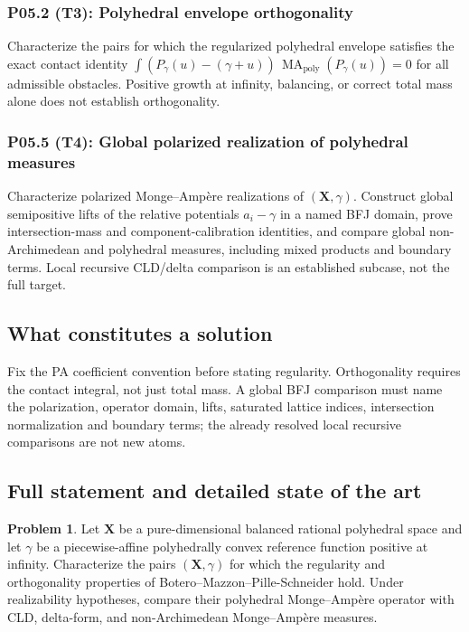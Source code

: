 \documentclass[11pt,a4paper]{article}
\theoremstyle{definition}
\newtheorem{problem}{Problem}[section]
\theoremstyle{remark}
\DeclareMathOperator{\MA}{MA}
\begin{document}
\subsubsection*{P05.2 (T3): Polyhedral envelope orthogonality}
\label{atom:P05.2}
Characterize the pairs for which the regularized polyhedral envelope satisfies the exact contact identity \(\int(P_\gamma(u)-(\gamma+u))\,\MA_{\mathrm{poly}}(P_\gamma(u))=0\) for all admissible obstacles. Positive growth at infinity, balancing, or correct total mass alone does not establish orthogonality.

\subsubsection*{P05.5 (T4): Global polarized realization of polyhedral measures}
\label{atom:P05.5}
Characterize polarized Monge--Ampère realizations of \((\mathbf X,\gamma)\). Construct global semipositive lifts of the relative potentials \(a_i-\gamma\) in a named BFJ domain, prove intersection-mass and component-calibration identities, and compare global non-Archimedean and polyhedral measures, including mixed products and boundary terms. Local recursive CLD/delta comparison is an established subcase, not the full target.

\subsection{What constitutes a solution}
Fix the PA coefficient convention before stating regularity. Orthogonality requires the contact integral, not just total mass. A global BFJ comparison must name the polarization, operator domain, lifts, saturated lattice indices, intersection normalization and boundary terms; the already resolved local recursive comparisons are not new atoms.

\subsection{Full statement and detailed state of the art}
\label{sec:ch72-polyhedral}

\begin{problem}\label{prob:frontier-polyhedral-regularity}
Let \(\mathbf X\) be a pure-dimensional balanced rational polyhedral space
and let \(\gamma\) be a piecewise-affine polyhedrally convex reference
function positive at infinity.  Characterize the pairs
\((\mathbf X,\gamma)\) for which the
regularity and orthogonality properties of Botero--Mazzon--Pille-Schneider
hold.  Under realizability hypotheses, compare their polyhedral
Monge--Amp\`ere operator with CLD, delta-form, and non-Archimedean
Monge--Amp\`ere measures.
\end{problem}
\end{document}
